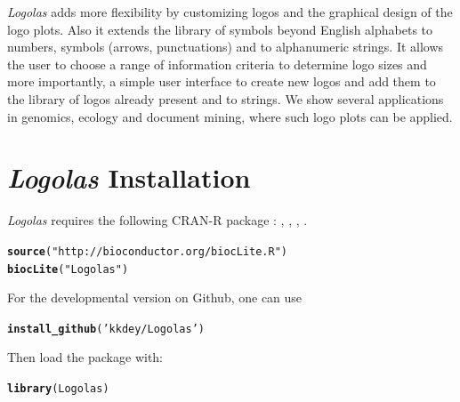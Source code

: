 \documentclass[12pt]{article}\usepackage[]{graphicx}\usepackage[usenames,dvipsnames]{color}
\makeatletter
\newcommand{\hlstr}[1]{\textcolor[rgb]{0.192,0.494,0.8}{#1}}%
\newcommand{\hlstd}[1]{\textcolor[rgb]{0.345,0.345,0.345}{#1}}%
\newcommand{\hlkwd}[1]{\textcolor[rgb]{0.737,0.353,0.396}{\textbf{#1}}}%
\newenvironment{kframe}{%
 \def\at@end@of@kframe{}%
 \ifinner\ifhmode%
  \def\at@end@of@kframe{\end{minipage}}%
  \begin{minipage}{\columnwidth}%
 \fi\fi%
 \def\FrameCommand##1{\hskip\@totalleftmargin \hskip-\fboxsep
 \colorbox{shadecolor}{##1}\hskip-\fboxsep
     \hskip-\linewidth \hskip-\@totalleftmargin \hskip\columnwidth}%
 \MakeFramed {\advance\hsize-\width
   \@totalleftmargin\z@ \linewidth\hsize
   \@setminipage}}%
 {\par\unskip\endMakeFramed%
 \at@end@of@kframe}
\newenvironment{knitrout}{}{} %
\newcommand{\Logolas}{\textit{Logolas}}
\makeatother
\begin{document}
\Logolas{} adds more flexibility by customizing logos and the graphical design of the logo plots. Also it extends the library of symbols beyond English alphabets to numbers, symbols (arrows, punctuations) and to alphanumeric strings. It allows the user to choose a range of information criteria to determine logo sizes and more importantly, a simple user interface to create new logos and add them to the library of logos already present and to strings. We show several applications in genomics, ecology and document mining, where such logo plots can be applied.

\section{\Logolas{} Installation}

\Logolas{} requires the following CRAN-R package : , , , .

\begin{knitrout}
\color{fgcolor}\begin{kframe}
\begin{alltt}
\hlkwd{source}\hlstd{(}\hlstr{"http://bioconductor.org/biocLite.R"}\hlstd{)}
\hlkwd{biocLite}\hlstd{(}\hlstr{"Logolas"}\hlstd{)}
\end{alltt}
\end{kframe}
\end{knitrout}

For the developmental version on Github, one can use

\begin{knitrout}
\color{fgcolor}\begin{kframe}
\begin{alltt}
\hlkwd{install_github}\hlstd{(}\hlstr{'kkdey/Logolas'}\hlstd{)}
\end{alltt}
\end{kframe}
\end{knitrout}

Then load the package with:

\begin{knitrout}
\color{fgcolor}\begin{kframe}
\begin{alltt}
\hlkwd{library}\hlstd{(Logolas)}
\end{alltt}
\end{kframe}
\end{knitrout}
\end{document}
